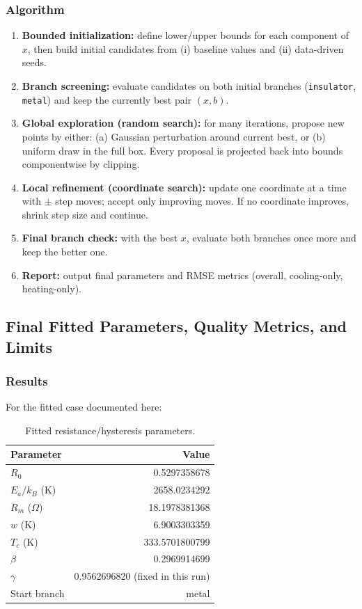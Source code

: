 \documentclass[11pt]{article}
\begin{document}
\subsubsection*{Algorithm}
\begin{enumerate}
    \item \textbf{Bounded initialization:} define lower/upper bounds for each component of \(x\), then build initial candidates from (i) baseline values and (ii) data-driven seeds.
    \item \textbf{Branch screening:} evaluate candidates on both initial branches (\texttt{insulator}, \texttt{metal}) and keep the currently best pair \((x,b)\).
    \item \textbf{Global exploration (random search):} for many iterations, propose new points by either:
    (a) Gaussian perturbation around current best, or
    (b) uniform draw in the full box.
    Every proposal is projected back into bounds componentwise by clipping.
    \item \textbf{Local refinement (coordinate search):} update one coordinate at a time with \(\pm\) step moves; accept only improving moves. If no coordinate improves, shrink step size and continue.
    \item \textbf{Final branch check:} with the best \(x\), evaluate both branches once more and keep the better one.
    \item \textbf{Report:} output final parameters and RMSE metrics (overall, cooling-only, heating-only).
\end{enumerate}

\subsection{Final Fitted Parameters, Quality Metrics, and Limits}
\subsubsection*{Results}
For the fitted case documented here:

\begin{table}[htbp]
\centering
\small
\caption{Fitted resistance/hysteresis parameters.}
\label{tab:fit_final_params}
\begin{tabular}{lr}
\toprule
Parameter & Value \\
\midrule
\(R_0\) & 0.5297358678 \\
\(E_a/k_B\) (K) & 2658.0234292 \\
\(R_m\) (\(\Omega\)) & 18.1978381368 \\
\(w\) (K) & 6.9003303359 \\
\(T_c\) (K) & 333.5701800799 \\
\(\beta\) & 0.2969914699 \\
\(\gamma\) & 0.9562696820 (fixed in this run) \\
Start branch & metal \\
\bottomrule
\end{tabular}
\end{table}
\end{document}
